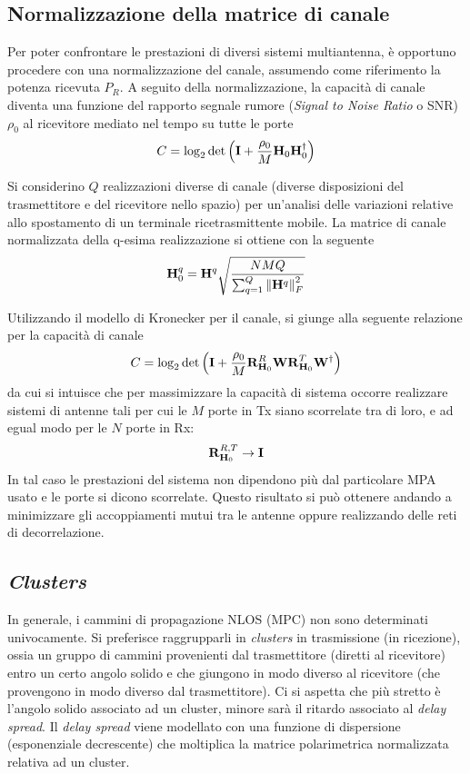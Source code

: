 \documentclass[technote]{IEEEtran}
\begin{document}
\subsection{Normalizzazione della matrice di canale} 

Per poter confrontare le prestazioni di diversi sistemi multiantenna, è opportuno procedere con una normalizzazione del canale, assumendo come riferimento la potenza ricevuta $P_R$. A seguito della normalizzazione, la capacità  di canale diventa una funzione del rapporto segnale rumore (\textit{Signal to Noise Ratio} o SNR) $\rho_0$ al ricevitore mediato nel tempo su tutte le porte \cite{Jensen, Gesbert}
\[C = {\log _2}\det \left( {{\bf{I}} + \frac{{{\rho _0}}}{M}{{\bf{H}}_0}{\bf{H}}_0^\dagger} \right)\]

\par Si considerino $Q$ realizzazioni diverse di canale (diverse disposizioni del trasmettitore e del ricevitore nello spazio) per un'analisi delle variazioni relative allo spostamento di un terminale ricetrasmittente mobile. La matrice di canale normalizzata della q-esima realizzazione si ottiene con la seguente
\[{\bf{H}}_0^q = {{\bf{H}}^q}\sqrt {\frac{{NMQ}}{{\sum\nolimits_{q = 1}^Q {\left\| {{{\bf{H}}^q}} \right\|_F^2} }}} \]

\par Utilizzando il modello di Kronecker per il canale, si giunge alla seguente relazione per la capacità  di canale
\[C = {\log _2}\det \left( {{\bf{I}} + \frac{{{\rho _0}}}{M}{\bf{R}}_{{{\bf{H}}_0}}^R{\bf{WR}}_{{{\bf{H}}_0}}^T{{\bf{W}}^\dagger}} \right)\]
da cui si intuisce che per massimizzare la capacità  di sistema occorre realizzare sistemi di antenne tali per cui le $M$ porte in Tx siano scorrelate tra di loro,  e ad egual modo per le $N$ porte in Rx:
\[{\bf{R}}_{{{\bf{H}}_0}}^{R,T} \to {\bf{I}}\]
In tal caso le  prestazioni del sistema non dipendono più dal particolare MPA usato e le porte si dicono scorrelate.
Questo risultato si può ottenere andando a minimizzare gli accoppiamenti mutui tra le antenne oppure realizzando delle reti di decorrelazione.

\subsection{\textit{Clusters}}

In generale, i cammini di propagazione NLOS (MPC) non sono determinati univocamente. Si preferisce raggrupparli in \textit{clusters} in trasmissione (in ricezione), ossia un gruppo di cammini provenienti dal trasmettitore (diretti al ricevitore) entro un certo angolo solido e che giungono in modo diverso al ricevitore (che provengono in modo diverso dal trasmettitore). Ci si aspetta che più stretto è l'angolo solido associato ad un {cluster}, minore sarà il ritardo associato al \textit{delay spread}. Il \textit{delay spread} viene modellato con una funzione di dispersione (esponenziale decrescente) che moltiplica la matrice polarimetrica normalizzata relativa ad un {cluster}.
\end{document}
